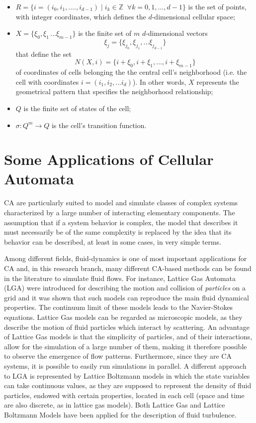 \begin{itemize}
\item $R = \{i = (i_0,i_1,....,i_{d-1}) \; | \; i_k \in \mathbb{Z} \;\; \forall k =
  0,1,...,d-1\}$ is the set of points, with integer coordinates, which
  defines the $d$-dimensional cellular space;

\item $X = \{\xi_0,\xi_1\,...\xi_{m-1}\}$ is the finite set of $m$
  $d$-dimensional vectors
  \[ \xi_j = \{\xi_{j_0},\xi_{j_1},...\xi_{j_{d-1}}\} \]
  that define the set
  \[ N(X,i) = \{i + \xi_0,i + \xi_1,...,i + \xi_{m-1}\} \]
  of coordinates of cells belonging the the central cell's
  neighborhood (i.e. the cell with coordinates $i =
  (i_1,i_2,...i_d)$). In other words, $X$ represents the geometrical
  pattern that specifies the neighborhood relationship;

\item $Q$ is the finite set of states of the cell;

\item $\sigma : Q^m \rightarrow Q$ is the cell's transition function.

\end{itemize}


\section{Some Applications of Cellular Automata}

CA are particularly suited to model and simulate classes of
complex systems characterized by a large number of interacting
elementary components.  The assumption that if a system behavior is
complex, the model that describes it must necessarily be of the same
complexity is replaced by the idea that its behavior can be
described, at least in some cases, in very simple terms.

Among different fields, fluid-dynamics is one of most important
applications for CA and, in this research branch, many different
CA-based methods can be found in the literature to simulate fluid
flows.  For instance, Lattice Gas Automata (LGA) were introduced for
describing the motion and collision of \emph{particles} on a grid and
it was shown that such models can reproduce the main fluid dynamical
properties. The continuum limit of these models leads to the
Navier-Stokes equations. Lattice Gas models can be regarded as
microscopic models, as they describe the motion of fluid particles
which interact by scattering. An advantage of Lattice Gas models is
that the simplicity of particles, and of their interactions, allow for
the simulation of a large number of them, making it therefore possible
to observe the emergence of flow patterns. Furthermore, since they are
CA systems, it is possible to easily run simulations in parallel. A
different approach to LGA is represented by Lattice Boltzmann models
in which the state variables can take continuous values, as they are
supposed to represent the density of fluid particles, endowed with
certain properties, located in each cell (space and time are also
discrete, as in lattice gas models). Both Lattice Gas and Lattice
Boltzmann Models have been applied for the description of fluid
turbulence.

